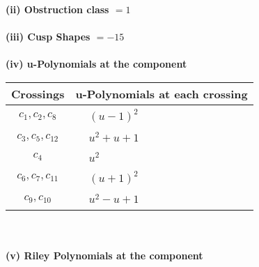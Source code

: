 \documentclass[1p]{elsarticle_modified}
\theoremstyle{definition}
\begin{document}
\flushleft \textbf{(ii) Obstruction class $= 1$}\\~\\
\flushleft \textbf{(iii) Cusp Shapes $= -15$}\\~\\
\newpage\renewcommand{\arraystretch}{1}
\flushleft \textbf{(iv) u-Polynomials at the component}\newline \\
\begin{tabular}{m{50pt}|m{274pt}}
Crossings & \hspace{64pt}u-Polynomials at each crossing \\
\hline $$\begin{aligned}c_{1},c_{2},c_{8}\end{aligned}$$&$\begin{aligned}
&(u-1)^2
\end{aligned}$\\
\hline $$\begin{aligned}c_{3},c_{5},c_{12}\end{aligned}$$&$\begin{aligned}
&u^2+u+1
\end{aligned}$\\
\hline $$\begin{aligned}c_{4}\end{aligned}$$&$\begin{aligned}
&u^2
\end{aligned}$\\
\hline $$\begin{aligned}c_{6},c_{7},c_{11}\end{aligned}$$&$\begin{aligned}
&(u+1)^2
\end{aligned}$\\
\hline $$\begin{aligned}c_{9},c_{10}\end{aligned}$$&$\begin{aligned}
&u^2- u+1
\end{aligned}$\\
\hline
\end{tabular}\\~\\
\newpage\renewcommand{\arraystretch}{1}
\flushleft \textbf{(v) Riley Polynomials at the component}\newline \\
\end{document}
